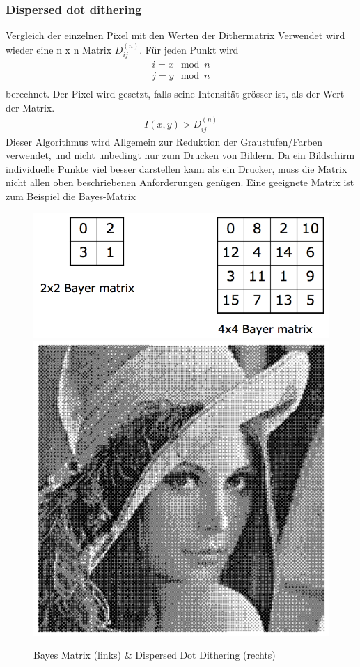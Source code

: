 \subsubsection{Dispersed dot dithering} 
Vergleich der einzelnen Pixel mit den Werten der Dithermatrix
Verwendet wird wieder eine n x n Matrix \(D_{ij}^{(n)}\). Für jeden Punkt wird
\begin{gather*}
i = x \mod n\\
j = y \mod n\\
\end{gather*}                                           
berechnet. Der Pixel wird gesetzt, falls seine Intensität grösser ist, als der Wert der Matrix.
\begin{gather*}
I(x,y) > D_{ij}^{(n)}   
\end{gather*}
Dieser Algorithmus wird Allgemein zur Reduktion der Graustufen/Farben verwendet, und nicht unbedingt nur zum Drucken von Bildern. Da ein Bildschirm individuelle Punkte viel besser darstellen kann als ein Drucker, muss die Matrix nicht allen oben beschriebenen Anforderungen genügen. Eine geeignete Matrix ist zum Beispiel die Bayes-Matrix
\begin{figure}[!ht]
\centering
\includegraphics[width=0.5\linewidth]{fig/bayesmatrix}
\includegraphics[width=0.3\linewidth]{fig/disperseddot}
\caption{Bayes Matrix (links) \& Dispersed Dot Dithering (rechts)}
\label{fig:bayesmatrix}
\end{figure}

